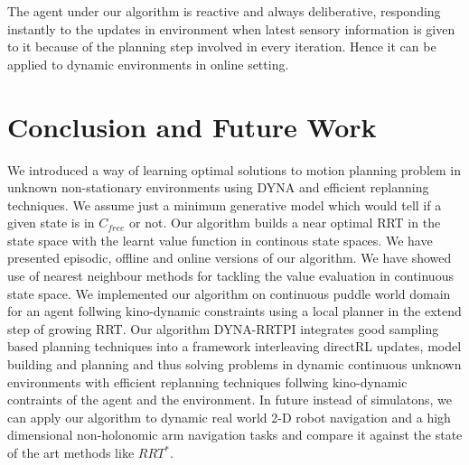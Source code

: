 \documentclass[MTech]{iitmdiss}
\begin{document}
The agent under our algorithm is reactive and always deliberative, responding instantly to the updates in environment when latest sensory information is given to it because of the planning step involved in every iteration. Hence it can be applied to dynamic environments in online setting.
 
 
\chapter{Conclusion and Future Work}
We introduced a way of learning optimal solutions to motion planning problem in unknown non-stationary environments using DYNA and efficient replanning techniques. We assume just a minimum generative model which would tell if a given state is in $C_{free}$ or not. Our algorithm builds a near optimal RRT in the state space with the learnt value function in continous state spaces. We have presented episodic, offline and online versions of our algorithm. We have showed use of nearest neighbour methods for tackling the value evaluation in continuous state space. We implemented our algorithm on continuous puddle world domain for an agent follwing kino-dynamic constraints using a local planner in the extend step of growing RRT. Our algorithm DYNA-RRTPI integrates good sampling based planning techniques into a framework interleaving directRL updates, model building and planning and thus solving problems in dynamic continuous unknown environments with efficient replanning techniques follwing kino-dynamic contraints of the agent and the environment. In future instead of simulatons, we can apply our algorithm to dynamic real world 2-D robot navigation and a high dimensional non-holonomic arm navigation tasks and compare it against the state of the art methods like $RRT^*$. 


%
\end{document}
